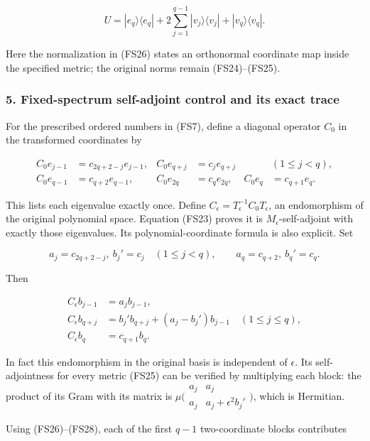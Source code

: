 \[
U=|e_q\rangle\langle e_q|
+2\sum_{j=1}^{q-1}|v_j\rangle\langle v_j|
+|v_q\rangle\langle v_q|.
\tag{FS27}
\]

Here the normalization in (FS26) states an orthonormal coordinate map inside the specified metric; the original norms remain (FS24)--(FS25).

\subsubsection{5. Fixed-spectrum self-adjoint control and its exact trace}\label{endpoint-four_window_sharpness--fixed-spectrum-self-adjoint-control-and-its-exact-trace}

For the prescribed ordered numbers in (FS7), define a diagonal operator \(C_0\) in the transformed coordinates by

\[
\begin{aligned}
C_0e_{j-1}&=c_{2q+2-j}e_{j-1},&
C_0e_{q+j}&=c_j e_{q+j}&&(1\le j<q),\\
C_0e_{q-1}&=c_{q+2}e_{q-1},&
C_0e_{2q}&=c_qe_{2q},&
C_0e_q&=c_{q+1}e_q.
\end{aligned}
\tag{FS28}
\]

This lists each eigenvalue exactly once. Define \(C_\epsilon=T_\epsilon^{-1}C_0T_\epsilon\), an endomorphism of the original polynomial space. Equation (FS23) proves it is \(M_\epsilon\)-self-adjoint with exactly those eigenvalues. Its polynomial-coordinate formula is also explicit. Set

\[
a_j=c_{2q+2-j},\ b_j'=c_j\quad(1\le j<q),
\qquad a_q=c_{q+2},\ b_q'=c_q.
\]

Then

\[
\begin{aligned}
C_\epsilon b_{j-1}&=a_j b_{j-1},\\
C_\epsilon b_{q+j}&=b_j' b_{q+j}+(a_j-b_j')b_{j-1}
\quad(1\le j\le q),\\
C_\epsilon b_q&=c_{q+1}b_q.
\end{aligned}
\tag{FS29}
\]

In fact this endomorphism in the original basis is independent of \(\epsilon\). Its self-adjointness for every metric (FS25) can be verified by multiplying each block: the product of its Gram with its matrix is \(\mu\bigl(\begin{smallmatrix}a_j&a_j\\a_j&a_j+\epsilon^2 b_j'\end{smallmatrix}\bigr)\), which is Hermitian.

Using (FS26)--(FS28), each of the first \(q-1\) two-coordinate blocks contributes

